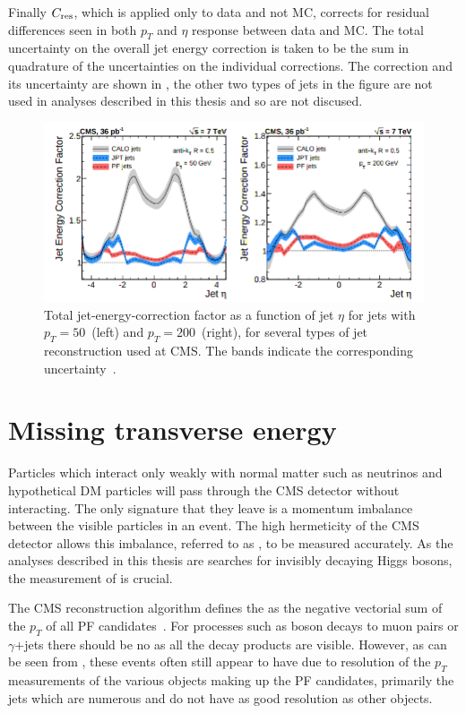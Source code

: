 Finally $C_{\rm{res}}$, which is applied only to data and not \ac{MC}, corrects for residual differences seen in both $p_{T}$ and $\eta$ response between data and \ac{MC}. The total uncertainty on the overall jet energy correction is taken to be the sum in quadrature of the uncertainties on the individual corrections. The correction and its uncertainty are shown in , the other two types of jets in the figure are not used in analyses described in this thesis and so are not discused.

\begin{figure}
  \includegraphics[width=1.2\largefigwidth]{plots/obj/jec.png}
  \caption{Total jet-energy-correction factor as a function of jet $\eta$ for jets with $p_{T}=50$\GeV\, (left) and $p_{T}=200$\GeV\, (right), for several types of jet reconstruction used at CMS. The bands indicate the corresponding uncertainty~\cite{CMS-JME-10-011}.}
  \label{fig:jec}
\end{figure}
\section{Missing transverse energy}
\label{sec:MET}
Particles which interact only weakly with normal matter such as neutrinos and hypothetical \ac{DM} particles will pass through the CMS detector without interacting. The only signature that they leave is a momentum imbalance between the visible particles in an event. The high hermeticity of the CMS detector allows this imbalance, referred to as \MET, to be measured accurately. As the analyses described in this thesis are searches for invisibly decaying Higgs bosons, the measurement of \MET is crucial.

The CMS \MET reconstruction algorithm defines the \MET as the negative vectorial sum of the $p_{T}$ of all \ac{PF} candidates~\cite{CMS-PAS-JME-12-002}. For processes such as \PZ boson decays to muon pairs or $\gamma$+jets there should be no \MET as all the decay products are visible. However, as can be seen from , these events often still appear to have \MET due to resolution of the $p_{T}$ measurements of the various objects making up the \ac{PF} candidates, primarily the jets which are numerous and do not have as good resolution as other objects.

